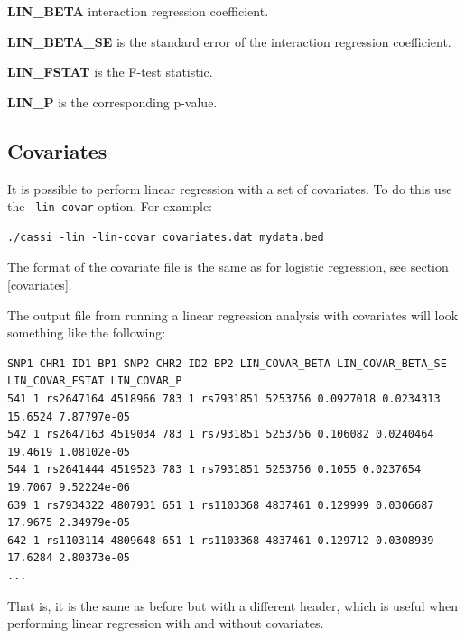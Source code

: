 \documentclass[a4paper,12pt]{article}
\newcommand{\code}[1]{{\footnotesize{{\tt #1}}}}
\begin{document}
{\bf LIN\_BETA} interaction regression coefficient. 

{\bf LIN\_BETA\_SE} is the standard error of the interaction regression coefficient. 

{\bf LIN\_FSTAT} is the F-test statistic. 

{\bf LIN\_P} is the corresponding p-value. 


\subsection{Covariates}
\label{lin-covariates}

It is possible to perform linear regression with a set of covariates. To do this use the \code{-lin-covar} option. For example: 
\vspace{0.35cm} \begin{lstlisting}
./cassi -lin -lin-covar covariates.dat mydata.bed

\end{lstlisting} \vspace{0.35cm}
The format of the covariate file is the same as for logistic regression, see  section \ref{covariates}. 

The output file from running a linear regression analysis with covariates will look something like the following: 
\vspace{0.35cm} \begin{lstlisting}
SNP1 CHR1 ID1 BP1 SNP2 CHR2 ID2 BP2 LIN_COVAR_BETA LIN_COVAR_BETA_SE LIN_COVAR_FSTAT LIN_COVAR_P
541 1 rs2647164 4518966 783 1 rs7931851 5253756 0.0927018 0.0234313 15.6524 7.87797e-05
542 1 rs2647163 4519034 783 1 rs7931851 5253756 0.106082 0.0240464 19.4619 1.08102e-05
544 1 rs2641444 4519523 783 1 rs7931851 5253756 0.1055 0.0237654 19.7067 9.52224e-06
639 1 rs7934322 4807931 651 1 rs1103368 4837461 0.129999 0.0306687 17.9675 2.34979e-05
642 1 rs1103114 4809648 651 1 rs1103368 4837461 0.129712 0.0308939 17.6284 2.80373e-05
...

\end{lstlisting} \vspace{0.35cm}
That is, it is the same as before but with a different header, which is useful when performing linear regression with and without covariates. 



\end{document}
